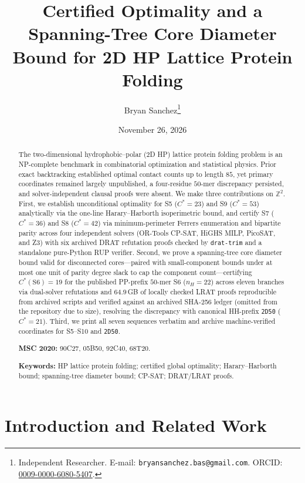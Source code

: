 \documentclass[11pt]{article}
\title{Certified Optimality and a Spanning-Tree Core Diameter Bound for 2D HP Lattice Protein Folding}
\author{%
  Bryan Sanchez\thanks{%
    Independent Researcher.
    E-mail: \texttt{bryansanchez.bas@gmail.com}.
    ORCID: \href{https://orcid.org/0009-0000-6080-5407}{0009-0000-6080-5407}.}
}
\date{November 26, 2026}
\newcommand{\Z}{\mathbb{Z}}
\begin{document}
\maketitle

\begin{abstract}
The two-dimensional hydrophobic--polar (2D HP) lattice protein folding problem is an NP-complete benchmark in combinatorial optimization and statistical physics. Prior exact backtracking established optimal contact counts up to length $85$, yet primary coordinates remained largely unpublished, a four-residue $50$-mer discrepancy persisted, and solver-independent clausal proofs were absent. We make three contributions on $\Z^2$. First, we establish unconditional optimality for S5 ($C^* = 23$) and S9 ($C^* = 53$) analytically via the one-line Harary--Harborth isoperimetric bound, and certify S7 ($C^* = 36$) and S8 ($C^* = 42$) via minimum-perimeter Ferrers enumeration and bipartite parity across four independent solvers (OR-Tools CP-SAT, HiGHS MILP, PicoSAT, and Z3) with six archived DRAT refutation proofs checked by \texttt{drat-trim} and a standalone pure-Python RUP verifier. Second, we prove a spanning-tree core diameter bound valid for disconnected cores---paired with small-component bounds under at most one unit of parity degree slack to cap the component count---certifying $C^*(\mathrm{S6}) = 19$ for the published PP-prefix $50$-mer S6 ($n_H = 22$) across eleven branches via dual-solver refutations and $64.9\,$GB of locally checked LRAT proofs reproducible from archived scripts and verified against an archived SHA-256 ledger (omitted from the repository due to size), resolving the discrepancy with canonical HH-prefix \texttt{2D50} ($C^* = 21$). Third, we print all seven sequences verbatim and archive machine-verified coordinates for S5--S10 and \texttt{2D50}.

\medskip
\noindent\textbf{MSC 2020:} 90C27, 05B50, 92C40, 68T20.

\noindent\textbf{Keywords:} HP lattice protein folding; certified global optimality; Harary--Harborth bound; spanning-tree diameter bound; CP-SAT; DRAT/LRAT proofs.
\end{abstract}

\section{Introduction and Related Work}\label{sec:intro}
\end{document}
